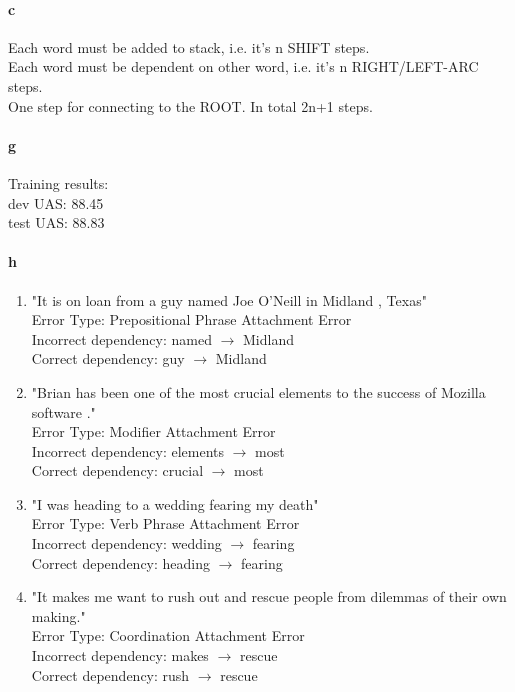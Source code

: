 \documentclass{article}
\begin{document}
\paragraph{c}
Each word must be added to stack, i.e. it's n SHIFT steps. \\
Each word must be dependent on other word, i.e. it's n RIGHT/LEFT-ARC steps. \\
One step for connecting to the ROOT. In total 2n+1 steps. \\

\paragraph{g} Training results: \\
dev UAS: 88.45 \\
test UAS: 88.83 \\

\paragraph{h}
\begin{enumerate}
\item
"It is on loan from a guy named Joe O’Neill in Midland , Texas" \\
    Error Type: Prepositional Phrase Attachment Error \\
    Incorrect dependency: named $\rightarrow$ Midland \\
    Correct dependency: guy $\rightarrow$ Midland \\

\item
"Brian has been one of the most crucial elements to the success of Mozilla software ." \\
    Error Type: Modifier Attachment Error \\
    Incorrect dependency: elements $\rightarrow$ most \\
    Correct dependency: crucial $\rightarrow$ most \\

\item
"I was heading to a wedding fearing my death" \\
    Error Type: Verb Phrase Attachment Error \\
    Incorrect dependency: wedding $\rightarrow$ fearing \\
    Correct dependency: heading $\rightarrow$ fearing \\
    
\item
"It makes me want to rush out and rescue people from dilemmas of their own making." \\
    Error Type: Coordination Attachment Error \\
    Incorrect dependency: makes $\rightarrow$ rescue \\
    Correct dependency: rush $\rightarrow$ rescue \\
\end{enumerate}
\end{document}

